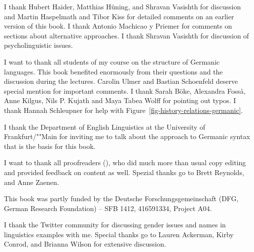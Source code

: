 \addchap{\lsAcknowledgementTitle} 

I thank Hubert Haider, Matthias Hüning, and Shravan Vasishth for discussion and Martin Haspelmath and Tibor Kiss for detailed comments
on an earlier version of this book. I thank Antonio Machicao y Priemer for comments on sections
about alternative approaches. I thank Shravan Vasishth for discussion of psycholinguistic issues.

I want to thank all students of my course on the structure of Germanic languages. This book
benefited enormously from their questions and the discussion during the lectures. 
Carolin Ulmer %
and
Bastian Schoenfeld %
deserve special mention for important comments. I thank 
Sarah Böke,
Alexandra Fosså,
Anne Kilgus,
Nils P. Kujath
and 
Maya Tabea Wolff  
for pointing out typos. I thank Hannah Schleupner for help with Figure~\ref{fig-history-relations-germanic}.

I thank the Department of English Linguistics at the University of Frankfurt/""Main for inviting me to
talk about the approach to Germanic syntax that is the basis for this book.

I want to thank all proofreaders (\makeatletter\@proofreader\makeatother), who did much more than
usual copy editing and provided feedback on 
content as well.  Spezial thanks go to Brett Reynolds, and Anne Zaenen.

This book was partly funded by the Deutsche Forschungsgemeinschaft (DFG, German Research Foundation) – SFB 1412, 416591334, Project A04.

I thank the Twitter community for discussing gender issues and names in linguistics examples with
me. Special thanks go to Lauren Ackerman, Kirby Conrod, and Brianna Wilson for extensive discussion.





